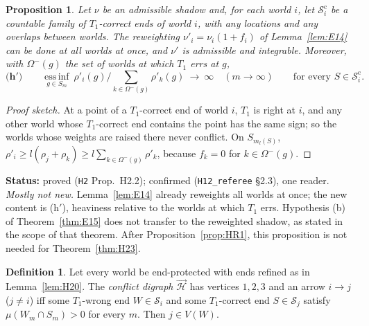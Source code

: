 \documentclass[11pt]{article}
\newtheorem{proposition}[theorem]{Proposition}
\theoremstyle{definition}
\newtheorem{definition}[theorem]{Definition}
\theoremstyle{remark}
\newcommand{\src}[1]{\texttt{#1}}
\newcommand{\status}[1]{\par\smallskip\noindent\textbf{Status:} #1\par\smallskip}
\begin{document}
\begin{proposition}\label{prop:H22}
Let $\nu$ be an admissible shadow and, for each world $i$, let $\mathcal S^{\mathrm c}_i$ be a countable family of $T_1$-correct ends of world $i$, with any locations and any overlaps between worlds. The reweighting $\nu'_i=\nu_i(1+f_i)$ of Lemma~\ref{lem:E14} can be done at all worlds at once, and $\nu'$ is admissible and integrable. Moreover, with $\Omega^-(g)$ the set of worlds at which $T_1$ errs at $g$,
\[
\textbf{(h$'$)}\qquad\operatorname*{ess\,inf}_{g\in S_m}\ \rho'_i(g)\Big/\sum_{k\in\Omega^-(g)}\rho'_k(g)\ \longrightarrow\ \infty\quad(m\to\infty)\qquad\text{for every }S\in\mathcal S^{\mathrm c}_i.
\]
\end{proposition}
\begin{proof}[Proof sketch]
At a point of a $T_1$-correct end of world $i$, $T_1$ is right at $i$, and any other world whose $T_1$-correct end contains the point has the same sign; so the worlds whose weights are raised there never conflict. On $S_{m_l(S)}$, $\rho'_i\ge l(\rho_j+\rho_k)\ge l\sum_{k\in\Omega^-(g)}\rho'_k$, because $f_k=0$ for $k\in\Omega^-(g)$.
\end{proof}
\status{proved (\src{H2} Prop.~H2.2); confirmed (\src{H12\_referee} \S2.3), one reader. \emph{Mostly not new.} Lemma~\ref{lem:E14} already reweights all worlds at once; the new content is (h$'$), heaviness relative to the worlds at which $T_1$ errs. Hypothesis (b) of Theorem~\ref{thm:E15} does not transfer to the reweighted shadow, as stated in the scope of that theorem. After Proposition~\ref{prop:HR1}, this proposition is not needed for Theorem~\ref{thm:H23}.}

\begin{definition}\label{def:conflict}
Let every world be end-protected with ends refined as in Lemma~\ref{lem:H20}. The \emph{conflict digraph} $\vec{\mathcal H}$ has vertices $1,2,3$ and an arrow $i\to j$ ($j\ne i$) iff some $T_1$-wrong end $W\in\mathcal S_i$ and some $T_1$-correct end $S\in\mathcal S_j$ satisfy $\mu(W_m\cap S_m)>0$ for every $m$. Then $j\in V(W)$.
\end{definition}
\end{document}
